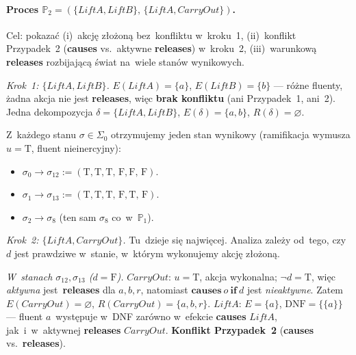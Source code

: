 \documentclass[11pt,a4paper]{article}
\newcommand{\causes}{\textbf{causes}}
\renewcommand{\iff}{\textbf{if}}
\newcommand{\releases}{\textbf{releases}}
\newcommand{\DNF}{\mathrm{DNF}}
\theoremstyle{definition}
\begin{document}
\paragraph{Proces $\mathbb{P}_2 = (\{\mathit{LiftA}, \mathit{LiftB}\},\,
\{\mathit{LiftA}, \mathit{CarryOut}\})$.}
Cel: pokazać (i)~akcję złożoną bez~konfliktu w~kroku~1,
(ii)~konflikt Przypadek~2 (\causes{} vs.~aktywne \releases{}) w~kroku~2,
(iii)~warunkową \releases{} rozbijającą świat na~wiele stanów wynikowych.

\medskip
\noindent\textit{Krok~1: $\{\mathit{LiftA}, \mathit{LiftB}\}$.}
$E(\mathit{LiftA}) = \{a\}$, $E(\mathit{LiftB}) = \{b\}$ --- różne fluenty,
żadna akcja nie jest \releases{}, więc \textbf{brak konfliktu} (ani Przypadek~1,
ani~2). Jedna dekompozycja $\delta = \{\mathit{LiftA}, \mathit{LiftB}\}$,
$E(\delta) = \{a, b\}$, $R(\delta) = \varnothing$.

\smallskip
Z~każdego stanu $\sigma \in \Sigma_0$ otrzymujemy jeden stan wynikowy
(ramifikacja wymusza $u = \text{T}$, fluent nieinercyjny):
\begin{itemize}[topsep=2pt]
  \item $\sigma_0 \to \sigma_{12} := (\text{T},\text{T},\text{T},\,\text{F},\text{F},\,\text{F})$.
  \item $\sigma_1 \to \sigma_{13} := (\text{T},\text{T},\text{T},\,\text{F},\text{T},\,\text{F})$.
  \item $\sigma_2 \to \sigma_{8}$ (ten sam $\sigma_8$ co~w~$\mathbb{P}_1$).
\end{itemize}

\medskip
\noindent\textit{Krok~2: $\{\mathit{LiftA}, \mathit{CarryOut}\}$.}
Tu~dzieje się najwięcej. Analiza zależy od~tego, czy~$d$ jest prawdziwe
w~stanie, w~którym wykonujemy akcję złożoną.

\smallskip\noindent
\emph{W~stanach $\sigma_{12}, \sigma_{13}$ ($d = \text{F}$).}
$\mathit{CarryOut}$: $u = \text{T}$, akcja wykonalna; $\neg d = \text{T}$,
więc \emph{aktywna} jest~\releases{} dla $a, b, r$, natomiast $\causes\ o\ \iff\ d$
jest \emph{nieaktywne}. Zatem $E(\mathit{CarryOut}) = \varnothing$,
$R(\mathit{CarryOut}) = \{a, b, r\}$.
$\mathit{LiftA}$: $E = \{a\}$, $\DNF = \{\{a\}\}$ --- fluent $a$~występuje
w~DNF zarówno w~efekcie \causes{} $\mathit{LiftA}$, jak~i~w~aktywnej \releases{}
$\mathit{CarryOut}$. \textbf{Konflikt Przypadek~2} (\causes{} vs.~\releases{}).
\end{document}
